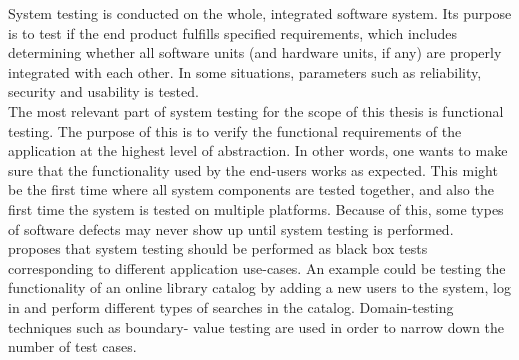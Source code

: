 System testing is conducted on the whole, integrated software system.
Its purpose is to test if the end product fulfills specified
requirements, which includes determining whether all software units (and
hardware units, if any) are properly integrated with each other. In some
situations, parameters such as reliability, security and usability is
tested.\cite{book:adp}\\

The most relevant part of system testing for the scope of this thesis is
functional testing. The purpose of this is to verify the functional
requirements of the application at the highest level of abstraction. In
other words, one wants to make sure that the functionality used by the
end-users works as expected. This might be the first time where all
system components are tested together, and also the first time the
system is tested on multiple platforms. Because of this, some types of
software defects may never show up until system testing is
performed.\cite{book:adp}\\

\citeauthor{book:adp} proposes that system testing should be performed
as black box tests corresponding to different application use-cases. An
example could be testing the functionality of an online library catalog
by adding a new users to the system, log in and perform different types
of searches in the catalog. Domain-testing techniques such as boundary-
value testing are used in order to narrow down the number of test
cases.\\
